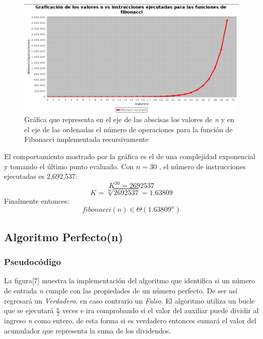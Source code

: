 \documentclass{report}
\begin{document}
            \begin{figure}[!h]
                \centering
            	\includegraphics[width=14cm]{Imagenes/FibonacciRecursivo.png}
                \caption{Gráfica que representa en el eje de las abscisas los valores de \textit{n} y en el eje de las ordenadas el número de operaciones para la función de Fibonacci implementada recursivamente}
                \label{fig:my_label}
            \end{figure}
            
            El comportamiento mostrado por la gráfica es el de una complejidad exponencial y tomando el último punto evaluado. Con $n=30$ , el número de instrucciones ejecutadas es 2,692,537:
            $$ K^{30} = 2692537$$
            $$ K = \sqrt[30]{2692537} = 1.63809 $$
            Finalmente entonces:
            $$ fibonacci(n) \in \Theta (1.63809^n) $$
        
    \newpage
        
    \subsection*{Algoritmo Perfecto(n)}
        \subsubsection*{Pseudocódigo}
            La figura[7] muestra la implementación del algoritmo que identifica si un número de entrada \textit{n} cumple con las propiedades de un número perfecto. De ser así regresará un \textit{Verdadero}, en caso contrario un \textit{Falso}.
            El algoritmo utiliza un bucle que se ejecutará $\frac{n}{2}$ veces e ira comprobando si el valor del auxiliar puede dividir al ingreso \textit{n} como entero, de esta forma si es verdadero entonces sumará el valor del acumulador que representa la suma de los dividendos.
            
\end{document}
